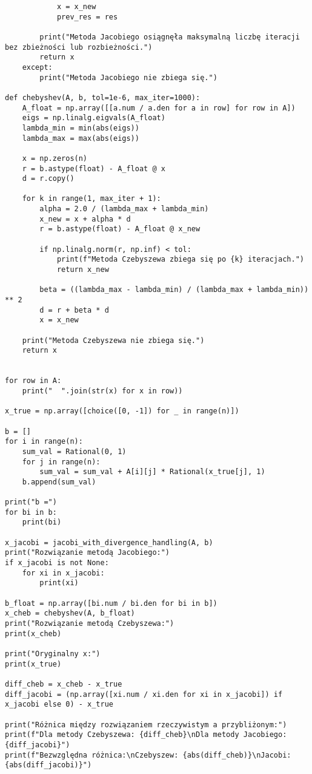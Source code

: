 \documentclass[a4paper,12pt]{article}
\begin{document}
\begin{lstlisting}
            x = x_new
            prev_res = res

        print("Metoda Jacobiego osiągnęła maksymalną liczbę iteracji bez zbieżności lub rozbieżności.")
        return x
    except:
        print("Metoda Jacobiego nie zbiega się.")

def chebyshev(A, b, tol=1e-6, max_iter=1000):
    A_float = np.array([[a.num / a.den for a in row] for row in A])
    eigs = np.linalg.eigvals(A_float)
    lambda_min = min(abs(eigs))
    lambda_max = max(abs(eigs))

    x = np.zeros(n)
    r = b.astype(float) - A_float @ x
    d = r.copy()

    for k in range(1, max_iter + 1):
        alpha = 2.0 / (lambda_max + lambda_min)
        x_new = x + alpha * d
        r = b.astype(float) - A_float @ x_new

        if np.linalg.norm(r, np.inf) < tol:
            print(f"Metoda Czebyszewa zbiega się po {k} iteracjach.")
            return x_new

        beta = ((lambda_max - lambda_min) / (lambda_max + lambda_min)) ** 2
        d = r + beta * d
        x = x_new

    print("Metoda Czebyszewa nie zbiega się.")
    return x


for row in A:
    print("  ".join(str(x) for x in row))

x_true = np.array([choice([0, -1]) for _ in range(n)])

b = []
for i in range(n):
    sum_val = Rational(0, 1)
    for j in range(n):
        sum_val = sum_val + A[i][j] * Rational(x_true[j], 1)
    b.append(sum_val)

print("b =")
for bi in b:
    print(bi)

x_jacobi = jacobi_with_divergence_handling(A, b)
print("Rozwiązanie metodą Jacobiego:")
if x_jacobi is not None:
    for xi in x_jacobi:
        print(xi)

b_float = np.array([bi.num / bi.den for bi in b])
x_cheb = chebyshev(A, b_float)
print("Rozwiązanie metodą Czebyszewa:")
print(x_cheb)

print("Oryginalny x:")
print(x_true)

diff_cheb = x_cheb - x_true
diff_jacobi = (np.array([xi.num / xi.den for xi in x_jacobi]) if x_jacobi else 0) - x_true

print("Różnica między rozwiązaniem rzeczywistym a przybliżonym:")
print(f"Dla metody Czebyszewa: {diff_cheb}\nDla metody Jacobiego: {diff_jacobi}")
print(f"Bezwzględna różnica:\nCzebyszew: {abs(diff_cheb)}\nJacobi: {abs(diff_jacobi)}")
\end{lstlisting}
\end{document}

